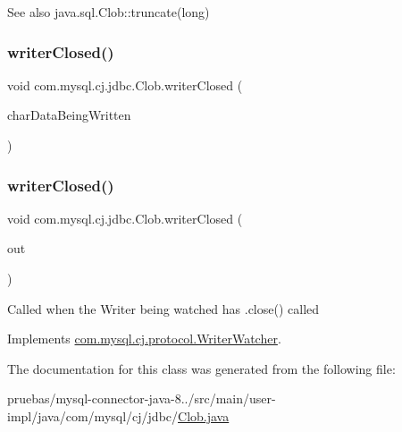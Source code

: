 \begin{DoxySeeAlso}{See also}
java.\+sql.\+Clob\+::truncate(long) 
\end{DoxySeeAlso}
\mbox{\label{classcom_1_1mysql_1_1cj_1_1jdbc_1_1_clob_a511b2df17d5336e806c022512c86e042}} 
\subsubsection{\texorpdfstring{writer\+Closed()}{writerClosed()}\hspace{0.1cm}{\footnotesize\ttfamily [1/2]}}
{\footnotesize\ttfamily void com.\+mysql.\+cj.\+jdbc.\+Clob.\+writer\+Closed (\begin{DoxyParamCaption}\item[{char \mbox{[}$\,$\mbox{]}}]{char\+Data\+Being\+Written }\end{DoxyParamCaption})}

\mbox{\label{classcom_1_1mysql_1_1cj_1_1jdbc_1_1_clob_ab6d96b9b821f777e7b25850ceb480c2b}} 
\subsubsection{\texorpdfstring{writer\+Closed()}{writerClosed()}\hspace{0.1cm}{\footnotesize\ttfamily [2/2]}}
{\footnotesize\ttfamily void com.\+mysql.\+cj.\+jdbc.\+Clob.\+writer\+Closed (\begin{DoxyParamCaption}\item[{\mbox{\hyperlink{classcom_1_1mysql_1_1cj_1_1protocol_1_1_watchable_writer}{Watchable\+Writer}}}]{out }\end{DoxyParamCaption})}

Called when the Writer being watched has .close() called 

Implements \mbox{\hyperlink{interfacecom_1_1mysql_1_1cj_1_1protocol_1_1_writer_watcher_a12b4673c6a8478886d9d53dae4afe032}{com.\+mysql.\+cj.\+protocol.\+Writer\+Watcher}}.



The documentation for this class was generated from the following file\+:\begin{DoxyCompactItemize}
\item 
pruebas/mysql-\/connector-\/java-\/8../src/main/user-\/impl/java/com/mysql/cj/jdbc/\mbox{\hyperlink{_clob_8java}{Clob.\+java}}\end{DoxyCompactItemize}
